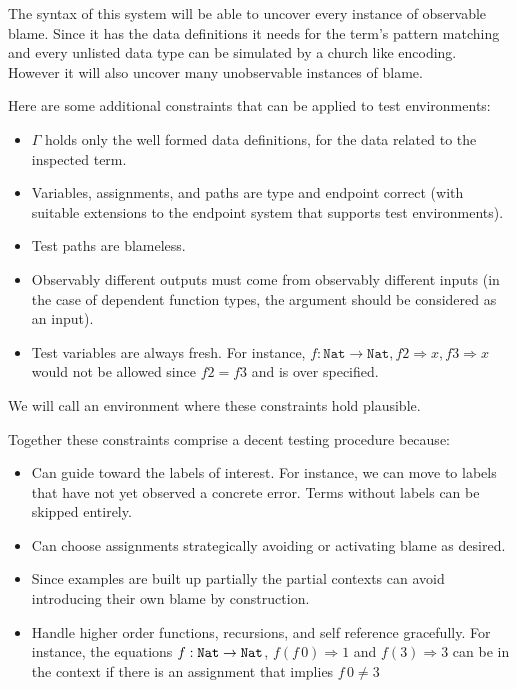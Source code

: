 The syntax of this system will be able to uncover every instance of observable blame.
Since it has the data definitions it needs for the term's pattern matching and every unlisted data type can be simulated by a church like encoding.
However it will also uncover many unobservable instances of blame.

Here are some additional constraints that can be applied to test environments:

\begin{itemize}
  \item $\Gamma$ holds only the well formed data definitions, for the data related to the inspected term.
  \item Variables, assignments, and paths are type and endpoint correct (with suitable extensions to the endpoint system that supports test environments).
  \item Test paths are blameless.
  \item Observably different outputs must come from observably different inputs (in the case of dependent function types, the argument should be considered as an input).
  \item Test variables are always fresh.
  For instance, $f:\mathtt{Nat}\rightarrow\mathtt{Nat},f2\Rightarrow x,f3\Rightarrow x$ would not be allowed since $f2=f3$ and is over specified.
\end{itemize}
We will call an environment where these constraints hold plausible.

Together these constraints comprise a decent testing procedure because:
\begin{itemize}
\item Can guide toward the labels of interest.
For instance, we can move to labels that have not yet observed a concrete error.
Terms without labels can be skipped entirely.
\item Can choose assignments strategically avoiding or activating blame as desired.
\item Since examples are built up partially the partial contexts can avoid introducing their own blame by construction.
\item Handle higher order functions, recursions, and self reference gracefully.
For instance, the equations $f: \mathtt{Nat}{} \rightarrow \mathtt{Nat}{}$, $f\left(f\,0\right)\Rightarrow 1$ and $f\left(3\right)\Rightarrow 3$ can be in the context if there is an assignment that implies $f\,0\neq3$
\end{itemize}
  
  
  
